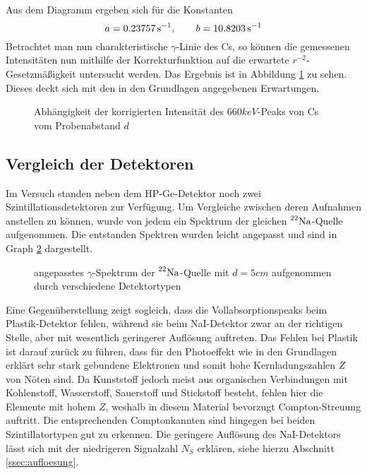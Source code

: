		Aus dem Diagramm ergeben sich für die Konstanten
		\[
			a=0.23757\, \mathrm{{s}^{-1}},\qquad b=10.8203\, \mathrm{{s}^{-1}}
		\]
		Betrachtet man nun charakteristische $\gamma$-Linie des Cs, so können die gemessenen Intensitäten nun mithilfe der Korrekturfunktion auf die erwartete $r^{-2}$-Gesetzmäßigkeit untersucht werden.
		Das Ergebnis ist in Abbildung \ref{fig:abstand} zu sehen.
		Dieses deckt sich mit den in den Grundlagen angegebenen Erwartungen.

		\begin{figure}[htb]
			\centering
			
			\caption{Abhängigkeit der korrigierten Intensität des $660\unit{keV}$-Peaks von Cs vom Probenabstand $d$}
			\label{fig:abstand}
		\end{figure}
	

	\FloatBarrier
	\subsection{Vergleich der Detektoren}
	\label{ssec:vergleich}

		Im Versuch standen neben dem HP-Ge-Detektor noch zwei Szintillationsdetektoren zur Verfügung.
		Um Vergleiche zwischen deren Aufnahmen anstellen zu können, wurde von jedem ein Spektrum der gleichen $\prescript{22}{}{\mathrm{Na}}$-Quelle aufgenommen.
		Die entstanden Spektren wurden leicht angepasst und sind in Graph \ref{fig:detektoren} dargestellt.
	
		\begin{figure}[htb]
			\centering
			
			\caption{angepasstes $\gamma$-Spektrum der $\prescript{22}{}{\mathrm{Na}}$-Quelle mit $d=5\unit{cm}$ aufgenommen durch verschiedene Detektortypen}
			\label{fig:detektoren}
		\end{figure}

		Eine Gegenüberstellung zeigt sogleich, dass die Vollabsorptionspeaks beim Plastik-Detektor fehlen, während sie beim NaI-Detektor zwar an der richtigen Stelle, aber mit wesentlich geringerer Auflösung auftreten.
		Das Fehlen bei Plastik ist darauf zurück zu führen, dass für den Photoeffekt wie in den Grundlagen erklärt sehr stark gebundene Elektronen und somit hohe Kernladungszahlen $Z$ von Nöten sind.
		Da Kunststoff jedoch meist aus organischen Verbindungen mit Kohlenstoff, Wasserstoff, Sauerstoff und Stickstoff besteht, fehlen hier die Elemente mit hohem $Z$, weshalb in diesem Material bevorzugt Compton-Streuung auftritt.
		Die entsprechenden Comptonkannten sind hingegen bei beiden Szintillatortypen gut zu erkennen.
		Die geringere Auflösung des NaI-Detektors lässt sich mit der niedrigeren Signalzahl $N_S$ erklären, siehe hierzu Abschnitt \ref{ssec:aufloesung}.
	
